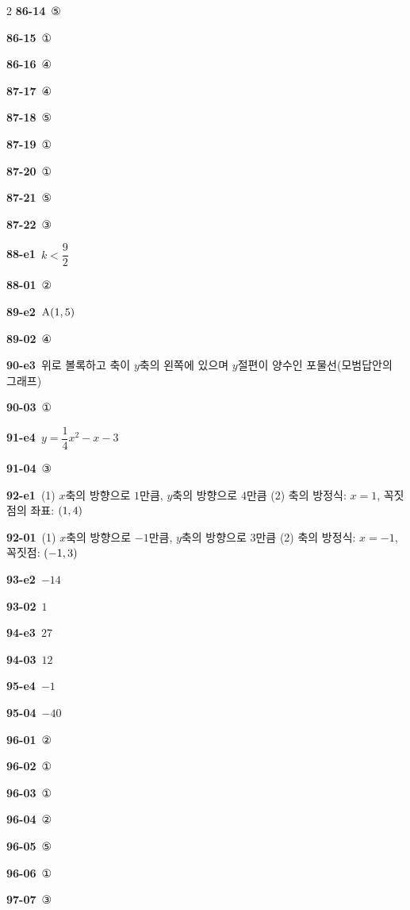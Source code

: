 \documentclass[10pt,a4paper]{article}
\newcommand{\pt}[1]{\mathrm{#1}}
\begin{document}
\begin{multicols}{2}
\noindent\textbf{86-14}\ ⑤\par
\noindent\textbf{86-15}\ ①\par
\noindent\textbf{86-16}\ ④\par
\noindent\textbf{87-17}\ ④\par
\noindent\textbf{87-18}\ ⑤\par
\noindent\textbf{87-19}\ ①\par
\noindent\textbf{87-20}\ ①\par
\noindent\textbf{87-21}\ ⑤\par
\noindent\textbf{87-22}\ ③\par
\noindent\textbf{88-e1}\ $k<\dfrac{9}{2}$\par
\noindent\textbf{88-01}\ ②\par
\noindent\textbf{89-e2}\ $\pt{A}(1{,}\mkern3mu 5)$\par
\noindent\textbf{89-02}\ ④\par
\noindent\textbf{90-e3}\ 위로 볼록하고 축이 $y$축의 왼쪽에 있으며 $y$절편이 양수인 포물선(모범답안의 그래프)\par
\noindent\textbf{90-03}\ ①\par
\noindent\textbf{91-e4}\ $y=\dfrac{1}{4}x^2-x-3$\par
\noindent\textbf{91-04}\ ③\par
\noindent\textbf{92-e1}\ (1) $x$축의 방향으로 $1$만큼, $y$축의 방향으로 $4$만큼 (2) 축의 방정식: $x=1$, 꼭짓점의 좌표: $(1{,}\mkern3mu 4)$\par
\noindent\textbf{92-01}\ (1) $x$축의 방향으로 $-1$만큼, $y$축의 방향으로 $3$만큼 (2) 축의 방정식: $x=-1$, 꼭짓점: $(-1{,}\mkern3mu 3)$\par
\noindent\textbf{93-e2}\ $-14$\par
\noindent\textbf{93-02}\ $1$\par
\noindent\textbf{94-e3}\ $27$\par
\noindent\textbf{94-03}\ $12$\par
\noindent\textbf{95-e4}\ $-1$\par
\noindent\textbf{95-04}\ $-40$\par
\noindent\textbf{96-01}\ ②\par
\noindent\textbf{96-02}\ ①\par
\noindent\textbf{96-03}\ ①\par
\noindent\textbf{96-04}\ ②\par
\noindent\textbf{96-05}\ ⑤\par
\noindent\textbf{96-06}\ ①\par
\noindent\textbf{97-07}\ ③\par

\end{multicols}
\end{document}
